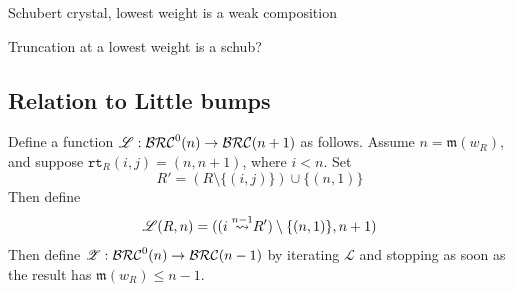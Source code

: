 \documentclass{amsart}
\theoremstyle{definition}
\theoremstyle{remark}
\numberwithin{equation}{subsection}
\newcommand{\wof}[1]{w_{#1}}
\newcommand{\wtt}{\mathtt{wt}}
\newcommand{\rtt}{\mathtt{rt}}
\newcommand{\code}{\mathfrak{c}}
\newcommand{\maxd}{\mathfrak{m}}
\begin{document}



Schubert crystal, lowest weight is a weak composition

Truncation at a lowest weight is a schub?

\subsection{Relation to Little bumps}


\newcommand{\lzeromap}{\mathscr{Z}}
\newcommand{\lmap}{\mathscr{L}}
Define a function $\lmap:\BRC^0(n)\to\BRC(n+1)$ as follows. Assume $n=\maxd(\wof{R})$, and suppose $\rtt_R(i, j) = (n, n + 1)$, where $i < n$. Set 
$$R'= (R\setminus \{(i, j)\})\cup \{(n,1)\}$$
Then define
$$\lmap(R, n) = ((\ins{n-1}{i} R')\setminus\{(n, 1)\}, n + 1)$$
Then define $\lzeromap:\BRC^0(n)\to \BRC(n-1)$ by iterating $\lmap$ and stopping as soon as the result has $\maxd(\wof{R})\leq n-1$.
\end{document}
